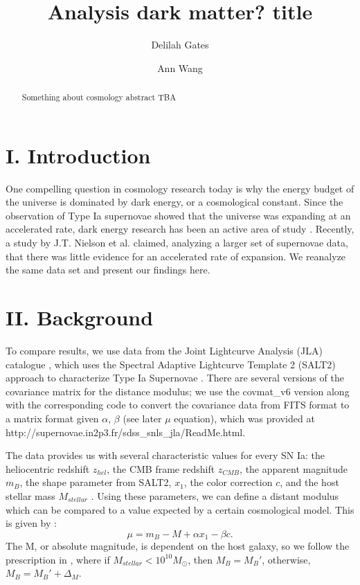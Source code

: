 \documentclass[aps,prl,reprint]{revtex4-1}
\begin{document}

\title{	Analysis dark matter? title}
\author{Delilah Gates}
\author{Ann Wang}
\begin{abstract}
Something about cosmology abstract TBA
\end{abstract}
\maketitle
\section{I. Introduction}
One compelling question in cosmology research today is why the energy budget of the universe is dominated by dark energy, or a cosmological constant. Since the observation of Type Ia supernovae showed that the universe was expanding at an accelerated rate, dark energy research has been an active area of study \cite{riess_sn}. Recently, a study by J.T. Nielson et al. \cite{shocker} claimed, analyzing a larger set of supernovae data, that there was little evidence for an accelerated rate of expansion. We reanalyze the same data set and present our findings here.
\section{II. Background}
To compare results, we use data from the Joint Lightcurve Analysis (JLA) catalogue \cite{sdss}, which uses the Spectral Adaptive Lightcurve Template 2 (SALT2) approach to characterize Type Ia Supernovae \cite{salt2}. There are several versions of the covariance matrix for the distance modulus; we use the covmat\_v6 version along with the corresponding code to convert the covariance data from FITS format \cite{fits} to a matrix format given $\alpha$, $\beta$ (see later $\mu$ equation), which was provided at http://supernovae.in2p3.fr/sdss\_snls\_jla/ReadMe.html. 
\par The data provides us with several characteristic values for every SN Ia: the heliocentric redshift $z_{hel}$, the CMB frame redshift $z_{CMB}$, the apparent magnitude $m_B$, the shape parameter from SALT2, $x_1$, the color correction $c$, and the host stellar mass $M_{stellar}$ \cite{sdss}. Using these parameters, we can define a distant modulus which can be compared to a value expected by a certain cosmological model. This is given by \cite{sdss}: $$\mu = m_B - M + \alpha x_1 - \beta c.$$ The M, or absolute magnitude, is dependent on the host galaxy, so we follow the prescription in \cite{sdss}, where if $M_{stellar} < 10^{10} M_{\odot}$, then $M_B = M_B'$, otherwise, $M_B = M_B' + \Delta_M$. 
\end{document}
